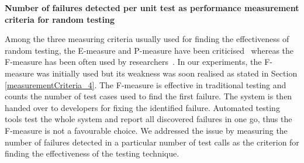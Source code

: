   
    







\textbf{Number of failures detected per unit test as performance measurement criteria for random testing}

Among the three measuring criteria usually used for finding the effectiveness of random testing, the E-measure and P-measure have been criticised~\cite{chen2005adaptive, chan2006restricted, chen2007quasi} whereas the F-measure has been often used by researchers~\cite{chen2004statistical, chen1996expected}. In our experiments, the F-measure was initially used but its weakness was soon realised as stated in Section \ref{measurementCriteria_4}. The F-measure is effective in traditional testing and counts the number of test cases used to find the first failure. The system is then handed over to developers for fixing the identified failure. Automated testing tools test the whole system and report all discovered failures in one go, thus the F-measure is not a favourable choice. We addressed the issue by measuring the number of failures detected in a particular number of test calls as the criterion for finding the effectiveness of the testing technique.\\

